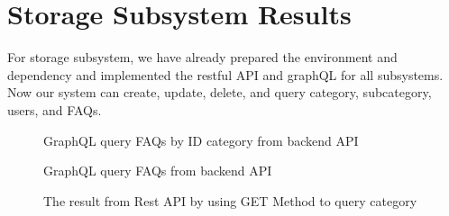 \documentclass[12pt,oneside,openright,a4paper]{cpe-english-project}
\begin{document}
\section{Storage Subsystem Results}
For storage subsystem, we have already prepared the environment and dependency and implemented the restful API and graphQL for all subsystems. Now our system can create, update, delete, and query category, subcategory, users, and FAQs.
\begin{figure}[!h]\centering
{}
\caption{GraphQL query FAQs by ID category from backend API}\label{fig:GraphQL query FAQs category from backend API}
\end{figure}
\begin{figure}[!h]\centering
{}
\caption{GraphQL query FAQs from backend API}\label{fig:GraphQL query FAQs from backend API}
\end{figure}
\begin{figure}[!h]\centering
{}
\caption{The result from Rest API by using GET Method to query category}\label{fig:The result from Rest API by using GET Method to query category}
\end{figure}
\end{document}
